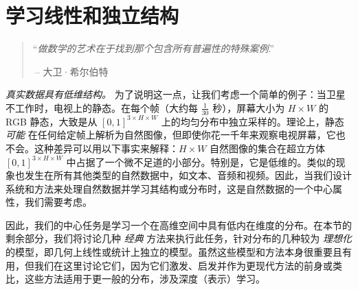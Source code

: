 \documentclass[../../book-main.tex]{subfiles}
\begin{document}
\chapter{学习线性和独立结构}
\label{ch:classic}\label{ch:linear-independent}

\begin{quote}
\hfill  ``{\em 做数学的艺术在于找到那个包含所有普遍性的特殊案例}.''

$~$\hfill -- 大卫·希尔伯特
\end{quote}
\vspace{5mm}






\textit{真实数据具有低维结构。} 为了说明这一点，让我们考虑一个简单的例子：当卫星不工作时，电视上的静态。在每个帧（大约每 \(\frac{1}{30}\) 秒），屏幕大小为 \(H \times W\) 的 RGB 静态，大致是从 \([0, 1]^{3 \times H \times W}\) 上的均匀分布中独立采样的。理论上，静态 \textit{可能} 在任何给定帧上解析为自然图像，但即使你花一千年来观察电视屏幕，它也不会。这种差异可以用以下事实来解释：\(H \times W\) 自然图像的集合在超立方体 \([0, 1]^{3 \times H \times W}\) 中占据了一个微不足道的小部分。特别是，它是低维的。类似的现象也发生在所有其他类型的自然数据中，如文本、音频和视频。因此，当我们设计系统和方法来处理自然数据并学习其结构或分布时，这是自然数据的一个中心属性，我们需要考虑。 %

因此，我们的中心任务是学习一个在高维空间中具有低内在维度的分布。在本节的剩余部分，我们将讨论几种 \textit{经典} 方法来执行此任务，针对分布的几种较为 {\em 理想化} 的模型，即几何上线性或统计上独立的模型。虽然这些模型和方法本身很重要且有用，但我们在这里讨论它们，因为它们激发、启发并作为更现代方法的前身或类比，这些方法适用于更一般的分布，涉及深度（表示）学习。
\end{document}
